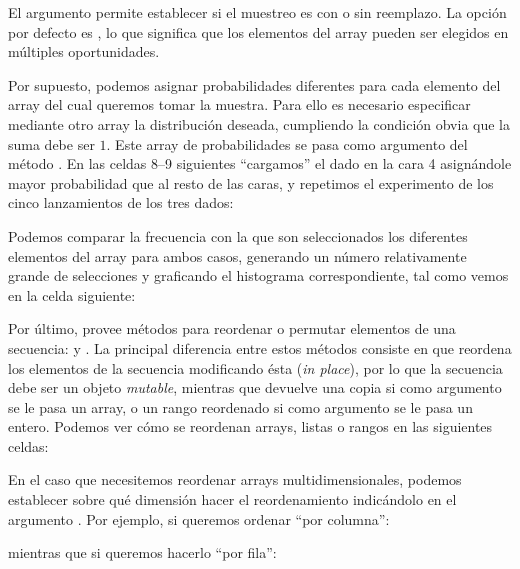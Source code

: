 
El argumento  permite establecer si el muestreo es con o sin reemplazo. La opción por defecto es , lo que significa que los elementos del array  pueden ser elegidos en múltiples oportunidades.

Por supuesto, podemos asignar probabilidades diferentes para cada elemento del array del cual queremos tomar la muestra. Para ello es necesario especificar mediante otro array la distribución deseada, cumpliendo la condición obvia que la suma debe ser $1$. Este array de probabilidades se pasa como argumento  del método . En las celdas 8--9 siguientes ``cargamos'' el dado en la cara 4 asignándole mayor probabilidad que al resto de las caras, y repetimos el experimento de los cinco lanzamientos de los tres dados:


Podemos comparar la frecuencia con la que son seleccionados los diferentes elementos del array  para ambos casos, generando un número relativamente grande de selecciones y graficando el histograma correspondiente, tal como vemos en la celda siguiente:


Por último,  provee métodos para reordenar o permutar elementos de una secuencia:  y . La principal diferencia entre estos métodos consiste en que  reordena los elementos de la secuencia modificando ésta (\textit{in place}), por lo que la secuencia debe ser un objeto \textit{mutable}, mientras que  devuelve una copia si como argumento se le pasa un array, o un rango reordenado si como argumento se le pasa un entero.  Podemos ver cómo se reordenan arrays, listas o rangos en las siguientes celdas:


En el caso que necesitemos reordenar arrays multidimensionales, podemos establecer sobre qué dimensión hacer el reordenamiento indicándolo en el argumento . Por ejemplo, si queremos ordenar ``por columna'':



mientras que si queremos hacerlo ``por fila'':

